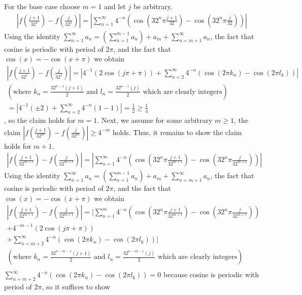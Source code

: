 \documentclass[10pt]{article}
\begin{document}
\begin{enumerate}[label=Problem \arabic*.]
\begin{itemize}
        For the base case choose $m=1$ and let $j$ be arbitrary.
        \begin{align*}
            |f(\frac{j+1}{32^1})-f(\frac{j}{32^1})|
            =|\sum_{n=1}^{\infty}4^{-n}(\cos(32^n\pi \frac{j+1}{32})-\cos(32^n\pi \frac{j}{32}))|    
        \end{align*}
        Using the identity $\displaystyle \sum_{n=1}^{\infty}a_n=(\sum_{n=1}^{m-1}a_n)+a_m+\sum_{n=m+1}^{\infty}a_n$, the fact that cosine is periodic with period of $2\pi$, and the fact that $\cos(x)=-\cos(x+\pi)$ we obtain
        \begin{align*}
            |f(\frac{j+1}{32^1})-f(\frac{j}{32^1})|
            =|4^{-1}(2\cos(j\pi+\pi))+\sum_{n=2}^{\infty}4^{-n}(\cos(2\pi k_n)-\cos(2\pi l_k))|\\
           (\text{where } k_n=\frac{32^{n-1}(j+1)}{2} \text{ and } l_n=\frac{32^{n-1}(j)}{2}\text{ which are clearly integers})\\
            =|4^{-1}(\pm2)+\sum_{n=2}^{\infty}4^{-n}(1-1)|
            =\frac{1}{2}\ge\frac{1}{4}   
        \end{align*}
        , so the claim holds for $m=1$.
        Next, we assume for some arbitrary $m\ge1$, the claim $|f(\frac{j+1}{32^m})-f(\frac{j}{32^m})|\ge4^{-m}$ holds. Thus, it remains to show the claim holds for $m+1$.
        \begin{align*}
            |f(\frac{j+1}{32^{m+1}})-f(\frac{j}{32^{m+1}})|
            =|\sum_{n=1}^{\infty}4^{-n}(\cos(32^n\pi \frac{j+1}{32^{m+1}})-\cos(32^n\pi \frac{j}{32^{m+1}}))|    
        \end{align*}
        Using the identity $\displaystyle \sum_{n=1}^{\infty}a_n=(\sum_{n=1}^{m-1}a_n)+a_m+\sum_{n=m+1}^{\infty}a_n$, the fact that cosine is periodic with period of $2\pi$, and the fact that $\cos(x)=-\cos(x+\pi)$ we obtain
        \begin{align*}
            |f(\frac{j+1}{32^{m+1}})-f(\frac{j}{32^{m+1}})|
            =|\sum_{n=1}^{m}4^{-n}(\cos(32^n\pi \frac{j+1}{32^{m+1}})-\cos(32^n\pi \frac{j}{32^{m+1}}))\\
            +4^{-m-1}(2\cos(j\pi+\pi))\\
            +\sum_{n=m+2}^{\infty}4^{-n}(\cos(2\pi k_n)-\cos(2\pi l_k))|\\
           (\text{where } k_n=\frac{32^{n-m-1}(j+1)}{2} \text{ and } l_n=\frac{32^{n-m-1}(j)}{2}\text{ which are clearly integers})\\
        \end{align*}
        $\displaystyle\sum_{n=m+2}^{\infty}4^{-n}(\cos(2\pi k_n)-\cos(2\pi l_k))=0$ because cosine is periodic with period of $2\pi$, so it suffices to show 

\end{itemize}
\end{enumerate}
\end{document}
